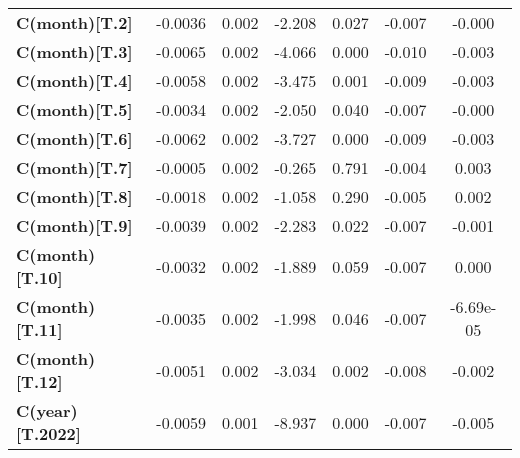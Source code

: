 \begin{center}
\begin{tabular}{lcccccc}
\textbf{C(month)[T.2]}                                                            &      -0.0036  &        0.002     &    -2.208  &         0.027        &       -0.007    &       -0.000     \\
\textbf{C(month)[T.3]}                                                            &      -0.0065  &        0.002     &    -4.066  &         0.000        &       -0.010    &       -0.003     \\
\textbf{C(month)[T.4]}                                                            &      -0.0058  &        0.002     &    -3.475  &         0.001        &       -0.009    &       -0.003     \\
\textbf{C(month)[T.5]}                                                            &      -0.0034  &        0.002     &    -2.050  &         0.040        &       -0.007    &       -0.000     \\
\textbf{C(month)[T.6]}                                                            &      -0.0062  &        0.002     &    -3.727  &         0.000        &       -0.009    &       -0.003     \\
\textbf{C(month)[T.7]}                                                            &      -0.0005  &        0.002     &    -0.265  &         0.791        &       -0.004    &        0.003     \\
\textbf{C(month)[T.8]}                                                            &      -0.0018  &        0.002     &    -1.058  &         0.290        &       -0.005    &        0.002     \\
\textbf{C(month)[T.9]}                                                            &      -0.0039  &        0.002     &    -2.283  &         0.022        &       -0.007    &       -0.001     \\
\textbf{C(month)[T.10]}                                                           &      -0.0032  &        0.002     &    -1.889  &         0.059        &       -0.007    &        0.000     \\
\textbf{C(month)[T.11]}                                                           &      -0.0035  &        0.002     &    -1.998  &         0.046        &       -0.007    &    -6.69e-05     \\
\textbf{C(month)[T.12]}                                                           &      -0.0051  &        0.002     &    -3.034  &         0.002        &       -0.008    &       -0.002     \\
\textbf{C(year)[T.2022]}                                                          &      -0.0059  &        0.001     &    -8.937  &         0.000        &       -0.007    &       -0.005     \\

\end{tabular}
\end{center}

